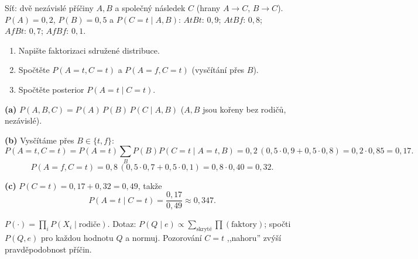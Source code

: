 \begin{zadani}
Síť: dvě nezávislé příčiny $A,B$ a společný následek $C$ (hrany $A\to C$, $B\to C$). $P(A)=0{,}2$, $P(B)=0{,}5$ a
$P(C{=}t\mid A,B)$: $A t B t{:}\,0{,}9$; $A t B f{:}\,0{,}8$; $A f B t{:}\,0{,}7$; $A f B f{:}\,0{,}1$.
\begin{enumerate}[label=(\alph*)]
  \item {} Napište faktorizaci sdružené distribuce.
  \item {} Spočtěte $P(A{=}t, C{=}t)$ a $P(A{=}f, C{=}t)$ (vysčítání přes $B$).
  \item {} Spočtěte posterior $P(A{=}t\mid C{=}t)$.
\end{enumerate}
\end{zadani}

\begin{reseni}
\textbf{(a)} $P(A,B,C)=P(A)\,P(B)\,P(C\mid A,B)$ ($A,B$ jsou kořeny bez rodičů, nezávislé).

\textbf{(b)} Vysčítáme přes $B\in\{t,f\}$:
\[
P(A{=}t,C{=}t)=P(A{=}t)\!\sum_B P(B)P(C{=}t\mid A{=}t,B)=0{,}2\,(0{,}5\cdot0{,}9+0{,}5\cdot0{,}8)=0{,}2\cdot0{,}85=0{,}17.
\]
\[
P(A{=}f,C{=}t)=0{,}8\,(0{,}5\cdot0{,}7+0{,}5\cdot0{,}1)=0{,}8\cdot0{,}40=0{,}32.
\]

\textbf{(c)} $P(C{=}t)=0{,}17+0{,}32=0{,}49$, takže
\[
P(A{=}t\mid C{=}t)=\frac{0{,}17}{0{,}49}\approx0{,}347.
\]
\end{reseni}

\begin{jadro}
$P(\cdot)=\prod_i P(X_i\mid\text{rodiče})$. Dotaz: $P(Q\mid e)\propto\sum_{\text{skryté}}\prod(\text{faktory})$; spočti $P(Q,e)$ pro každou hodnotu $Q$ a normuj. Pozorování $C{=}t$ ,,nahoru'' zvýší pravděpodobnost příčin.
\end{jadro}

